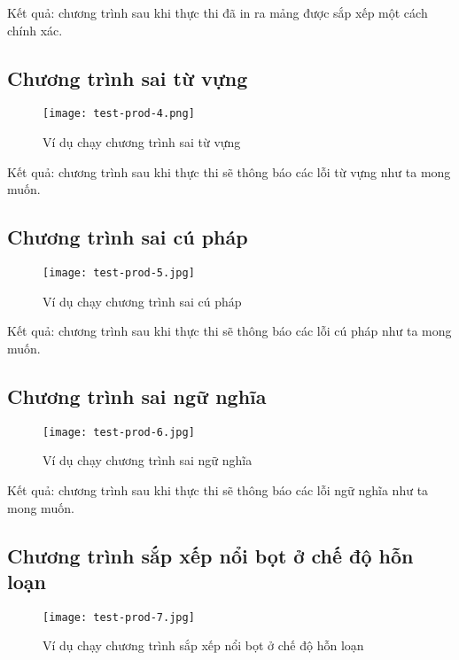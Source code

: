     Kết quả: chương trình sau khi thực thi đã in ra mảng được sắp xếp một cách chính xác.

\subsection{Chương trình sai từ vựng}

\begin{figure}[H]
    \centering
    \texttt{[image: test-prod-4.png]}
    \caption{Ví dụ chạy chương trình sai từ vựng}
\end{figure}

    Kết quả: chương trình sau khi thực thi sẽ thông báo các lỗi từ vựng như ta mong muốn.

\subsection{Chương trình sai cú pháp}

\begin{figure}[H]
    \centering
    \texttt{[image: test-prod-5.jpg]}
    \caption{Ví dụ chạy chương trình sai cú pháp}
\end{figure}

    Kết quả: chương trình sau khi thực thi sẽ thông báo các lỗi cú pháp như ta mong muốn.

\subsection{Chương trình sai ngữ nghĩa}

\begin{figure}[H]
    \centering
    \texttt{[image: test-prod-6.jpg]}
    \caption{Ví dụ chạy chương trình sai ngữ nghĩa}
\end{figure}

    Kết quả: chương trình sau khi thực thi sẽ thông báo các lỗi ngữ nghĩa như ta mong muốn.

\subsection{Chương trình sắp xếp nổi bọt ở chế độ hỗn loạn}

\begin{figure}[H]
    \centering
    \texttt{[image: test-prod-7.jpg]}
    \caption{Ví dụ chạy chương trình sắp xếp nổi bọt ở chế độ hỗn loạn}
\end{figure}

